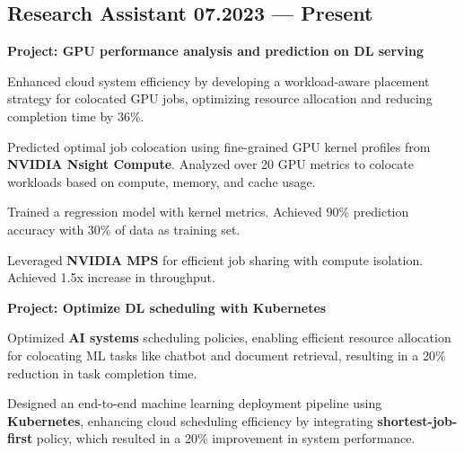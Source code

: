 \subsection{{Research Assistant \hfill 07.2023 --- Present}}

\begin{zitemize}
        \item \textbf{Project: GPU performance analysis and prediction on DL serving}
        \item Enhanced cloud system efficiency by developing a workload-aware placement strategy for colocated GPU jobs, optimizing resource allocation and reducing completion time by 36\%.
        \item Predicted optimal job colocation using fine-grained GPU kernel profiles from \textbf{NVIDIA Nsight Compute}. Analyzed over 20 GPU metrics to colocate workloads based on compute, memory, and cache usage.
        \item Trained a regression model with kernel metrics. Achieved 90\% prediction accuracy with 30\% of data as training set.
        \item Leveraged \textbf{NVIDIA MPS} for efficient job sharing with compute isolation. Achieved 1.5x increase in throughput.
\end{zitemize}
\vspace{-1.5pt}
\begin{zitemize}
        \item \textbf{Project: Optimize DL scheduling with Kubernetes}
        \item Optimized \textbf{AI systems} scheduling policies, enabling efficient resource allocation for colocating ML tasks like chatbot and document retrieval, resulting in a 20\% reduction in task completion time.
        \item Designed an end-to-end machine learning deployment pipeline using \textbf{Kubernetes}, enhancing cloud scheduling efficiency by integrating \textbf{shortest-job-first} policy, which resulted in a 20\% improvement in system performance.

\end{zitemize}

